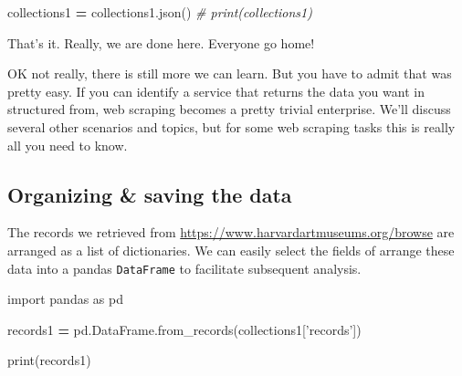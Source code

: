 \documentclass[]{book}
\newenvironment{Shaded}{\begin{snugshade}}{\end{snugshade}}
\newcommand{\BuiltInTok}[1]{#1}
\newcommand{\CommentTok}[1]{\textcolor[rgb]{0.56,0.35,0.01}{\textit{#1}}}
\newcommand{\ImportTok}[1]{#1}
\newcommand{\NormalTok}[1]{#1}
\newcommand{\OperatorTok}[1]{\textcolor[rgb]{0.81,0.36,0.00}{\textbf{#1}}}
\newcommand{\StringTok}[1]{\textcolor[rgb]{0.31,0.60,0.02}{#1}}
\begin{document}
\begin{Shaded}
\begin{Highlighting}[]
\NormalTok{collections1 }\OperatorTok{=}\NormalTok{ collections1.json()}
\CommentTok{# print(collections1)}
\end{Highlighting}
\end{Shaded}

That's it. Really, we are done here. Everyone go home!

OK not really, there is still more we can learn. But you have to admit that was pretty easy. If you can identify a service that returns the data you want in structured from, web scraping becomes a pretty trivial enterprise. We'll discuss several other scenarios and topics, but for some web scraping tasks this is really all you need to know.

\hypertarget{organizing-saving-the-data}{%
\subsection{Organizing \& saving the data}\label{organizing-saving-the-data}}

The records we retrieved from \url{https://www.harvardartmuseums.org/browse} are arranged as a list of dictionaries. We can easily select the fields of arrange these data into a pandas \texttt{DataFrame} to facilitate subsequent analysis.

\begin{Shaded}
\begin{Highlighting}[]
\ImportTok{import}\NormalTok{ pandas }\ImportTok{as}\NormalTok{ pd}
\end{Highlighting}
\end{Shaded}

\begin{Shaded}
\begin{Highlighting}[]
\NormalTok{records1 }\OperatorTok{=}\NormalTok{ pd.DataFrame.from_records(collections1[}\StringTok{'records'}\NormalTok{])}
\end{Highlighting}
\end{Shaded}

\begin{Shaded}
\begin{Highlighting}[]
\BuiltInTok{print}\NormalTok{(records1)}
\end{Highlighting}
\end{Shaded}
\end{document}
